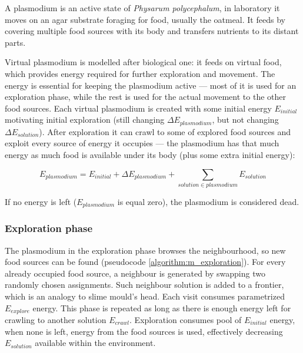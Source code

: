 \documentclass[english,a4paper,twoside]{ppfcmthesis}
\begin{document}
A plasmodium is an active state of \textit{Physarum polycephalum}, in laboratory it moves on an agar substrate foraging for food, usually the oatmeal. It feeds by covering multiple food sources with its body and transfers nutrients to its distant parts.

Virtual plasmodium is modelled after biological one: it feeds on virtual food, which provides energy required for further exploration and movement. The energy is essential for keeping the plasmodium active --- most of it is used for an exploration phase, while the rest is used for the actual movement to the other food sources. Each virtual plasmodium is created with some initial energy $E_{initial}$ motivating initial exploration (still changing ${\Delta}E_{plasmodium}$, but not changing ${\Delta}E_{solution}$). After exploration it can crawl to some of explored food sources and exploit every source of energy it occupies --- the plasmodium has that much energy as much food is available under its body (plus some extra initial energy):

\begin{equation}
  E_{plasmodium} = E_{initial} + {\Delta}E_{plasmodium} + \sum\limits_{solution \in plasmodium} E_{solution}
\end{equation}

\noindent If no energy is left ($E_{plasmodium}$ is equal zero), the plasmodium is considered dead.


\subsubsection{Exploration phase}

The plasmodium in the exploration phase browses the neighbourhood, so new food sources can be found (pseudocode \ref{algorithm:m_exploration}). For every already occupied food source, a neighbour is generated by swapping two randomly chosen assignments. Such neighbour solution is added to a frontier, which is an analogy to slime mould's head. Each visit consumes parametrized $E_{explore}$ energy. This phase is repeated as long as there is enough energy left for crawling to another solution $E_{crawl}$. Exploration consumes pool of $E_{initial}$ energy, when none is left, energy from the food sources is used, effectively decreasing $E_{solution}$ available within the environment.
\end{document}
